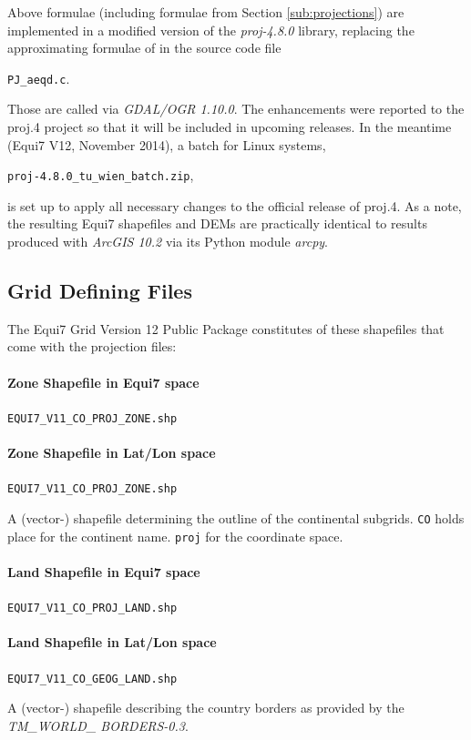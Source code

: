 \documentclass[11pt,a4paper]{article}
\begin{document}
Above formulae (including formulae from Section \ref{sub:projections}) are implemented in a modified version of the \textit{proj-4.8.0} library, replacing the approximating formulae of \citep{Snyder1987} in the source code file

\texttt{PJ\_aeqd.c}. 

Those are called via \textit{GDAL/OGR 1.10.0}. The enhancements were reported to the proj.4 project so that it will be included in upcoming releases. In the meantime (Equi7 V12, November 2014), a batch for Linux systems, 

\texttt{proj-4.8.0\_tu\_wien\_batch.zip},

is set up to apply all necessary changes to the official release of proj.4. As a note, the resulting Equi7 shapefiles and DEMs are practically identical to results produced with \textit{ArcGIS 10.2} via its Python module \textit{arcpy}.

\newpage

\subsection{Grid Defining Files}
\label{definingfiles}

The Equi7 Grid Version 12 Public Package constitutes of these shapefiles that come with the projection files:

\paragraph{Zone Shapefile in Equi7 space}
\texttt{EQUI7\_V11\_CO\_PROJ\_ZONE.shp}

\paragraph{Zone Shapefile in Lat/Lon space}
\texttt{EQUI7\_V11\_CO\_PROJ\_ZONE.shp}

A (vector-) shapefile determining the outline of the continental subgrids. \texttt{CO} holds place for the continent name. \texttt{proj} for the coordinate space.

\paragraph{Land Shapefile in Equi7 space}
\texttt{EQUI7\_V11\_CO\_PROJ\_LAND.shp}

\paragraph{Land Shapefile in Lat/Lon space}
\texttt{EQUI7\_V11\_CO\_GEOG\_LAND.shp}

A (vector-) shapefile describing the country borders as provided by the \textit{TM\_WORLD\_ BORDERS-0.3}.



\end{document}
